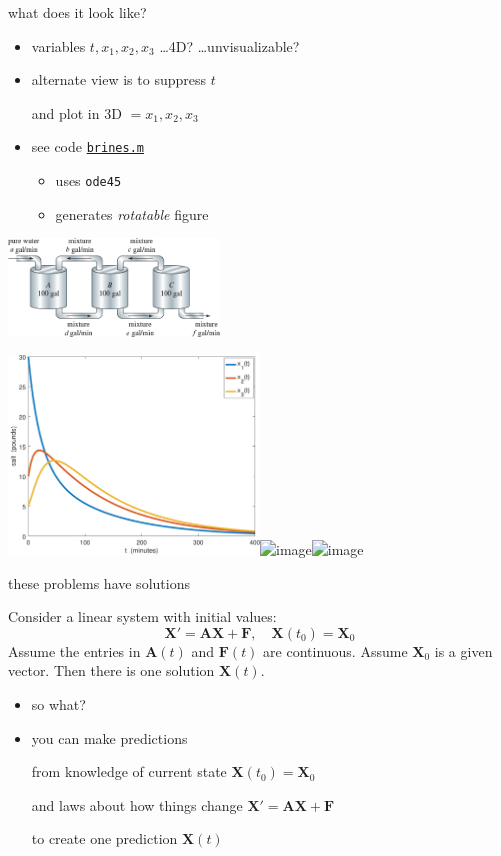 \documentclass[dvipsnames,colorlinks]{beamer}
\newcommand{\bA}{\mathbf{A}}
\newcommand{\bF}{\mathbf{F}}
\newcommand{\bX}{\mathbf{X}}
\begin{document}
\begin{frame}{what does it look like?}

\begin{itemize}
\item variables $t,x_1,x_2,x_3$ \dots 4D? \dots unvisualizable?
\item alternate view is to suppress $t$

and plot in 3D $=x_1,x_2,x_3$
\item see code \href{https://bueler.github.io/math302/assets/codes/F23/brines.m}{\texttt{brines.m}}
    \begin{itemize}
    \item<2> uses \texttt{ode45}
    \item<2> generates \emph{rotatable} figure
    \end{itemize}
\end{itemize}

\vspace{-21mm}
\hfill \includegraphics[width=0.42\textwidth]{figs/three-tanks}

\mbox{\includegraphics[width=0.5\textwidth]{figs/brines-xvt}\quad \includegraphics<1>[width=0.5\textwidth]{figs/brines-3d}\includegraphics<2>[width=0.5\textwidth]{figs/brines-3d-again}}
\end{frame}


\begin{frame}{these problems have solutions}

\begin{theorem}  Consider a linear system with initial values:
    $$\bX' = \bA \bX + \bF, \quad \bX(t_0)=\bX_0$$
Assume the entries in $\bA(t)$ and $\bF(t)$ are continuous.  Assume $\bX_0$ is a given vector.  Then there is one solution $\bX(t)$.
\end{theorem}

\bigskip
\begin{itemize}
\item so what?
\item \alert{you can make predictions}

from knowledge of current state \hfill $\bX(t_0)=\bX_0$

and laws about how things change \hfill $\bX' = \bA \bX + \bF$

to create one prediction \hfill $\bX(t)$
\end{itemize}
\end{frame}
\end{document}
